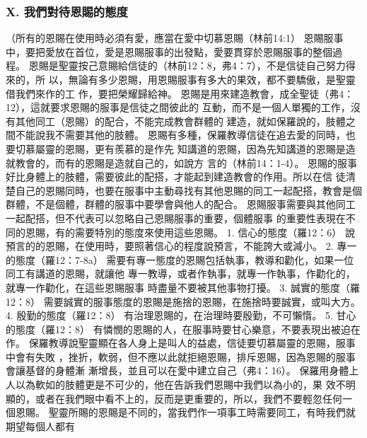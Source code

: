 \subsubsection{X. 我們對待恩賜的態度}
（所有的恩賜在使用時必須有愛，應當在愛中切慕恩賜（林前14:1）
恩賜服事中，要把愛放在首位，愛是恩賜服事的出發點，愛要貫穿於恩賜服事的整個過
程。
恩賜是聖靈按己意賜給信徒的（林前12：8，弗4：7），不是信徒自己努力得來的，所
以，無論有多少恩賜，用恩賜服事有多大的果效，都不要驕傲，是聖靈借我們來作的工
作，要把榮耀歸給神。
恩賜是用來建造教會，成全聖徒（弗4：12），這就要求恩賜的服事是信徒之間彼此的
互動，而不是一個人單獨的工作，沒有其他同工（恩賜）的配合，不能完成教會群體的
建造，就如保羅說的，肢體之間不能說我不需要其他的肢體。
恩賜有多種，保羅教導信徒在追去愛的同時，也要切慕屬靈的恩賜，更有羨慕的是作先
知講道的恩賜，因為先知講道的恩賜是造就教會的，而有的恩賜是造就自己的，如說方
言的（林前14：1-4）。
恩賜的服事好比身體上的肢體，需要彼此的配搭，才能起到建造教會的作用。所以在信
徒清楚自己的恩賜同時，也要在服事中主動尋找有其他恩賜的同工一起配搭，教會是個
群體，不是個體，群體的服事中要學會與他人的配合。
恩賜服事需要與其他同工一起配搭，但不代表可以忽略自己恩賜服事的重要，個體服事
的重要性表現在不同的恩賜，有的需要特別的態度來使用這些恩賜。
1. 信心的態度（羅12：6）
說預言的的恩賜，在使用時，要照著信心的程度說預言，不能誇大或減小。
2. 專一的態度（羅12：7-8a）
需要有專一態度的恩賜包括執事，教導和勸化，如果一位同工有講道的恩賜，就讓他
專一教導，或者作執事，就專一作執事，作勸化的，就專一作勸化，在這些恩賜服事
時盡量不要被其他事物打擾。
3. 誠實的態度（羅12：8）
需要誠實的服事態度的恩賜是施捨的恩賜，在施捨時要誠實，或叫大方。
4. 殷勤的態度（羅12：8）
有治理恩賜的，在治理時要殷勤，不可懶惰。
5. 甘心的態度（羅12：8）
有憐憫的恩賜的人，在服事時要甘心樂意，不要表現出被迫在作。
保羅教導說聖靈顯在各人身上是叫人的益處，信徒要切慕屬靈的恩賜，服事中會有失敗
，挫折，軟弱，但不應以此就拒絕恩賜，排斥恩賜，因為恩賜的服事會讓基督的身體漸
漸增長，並且可以在愛中建立自己（弗4：16）。
保羅用身體上人以為軟如的肢體更是不可少的，他在告訴我們恩賜中我們以為小的，果
效不明顯的，或者在我們眼中看不上的，反而是更重要的，所以，我們不要輕忽任何一
個恩賜。
聖靈所賜的恩賜是不同的，當我們作一項事工時需要同工，有時我們就期望每個人都有
